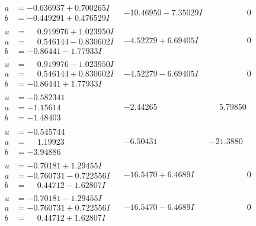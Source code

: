 \documentclass[1p]{elsarticle_modified}
\theoremstyle{definition}
\begin{document}
$$\begin{array}{c|c|c}
\begin{aligned}
a &= -0.636937 + 0.700265 I \\
b &= -0.449291 + 0.476529 I\end{aligned}
 & -10.46950 - 7.35029 I & \phantom{-0.000000 } 0 \\ \hline\begin{aligned}
u &= \phantom{-}0.919976 + 1.023950 I \\
a &= \phantom{-}0.546144 - 0.830602 I \\
b &= -0.86441 - 1.77933 I\end{aligned}
 & -4.52279 + 6.69405 I & \phantom{-0.000000 } 0 \\ \hline\begin{aligned}
u &= \phantom{-}0.919976 - 1.023950 I \\
a &= \phantom{-}0.546144 + 0.830602 I \\
b &= -0.86441 + 1.77933 I\end{aligned}
 & -4.52279 - 6.69405 I & \phantom{-0.000000 } 0 \\ \hline\begin{aligned}
u &= -0.582341\phantom{ +0.000000I} \\
a &= -1.15614\phantom{ +0.000000I} \\
b &= -1.48403\phantom{ +0.000000I}\end{aligned}
 & -2.44265\phantom{ +0.000000I} & \phantom{-}5.79850\phantom{ +0.000000I} \\ \hline\begin{aligned}
u &= -0.545744\phantom{ +0.000000I} \\
a &= \phantom{-}1.19923\phantom{ +0.000000I} \\
b &= -3.94886\phantom{ +0.000000I}\end{aligned}
 & -6.50431\phantom{ +0.000000I} & -21.3880\phantom{ +0.000000I} \\ \hline\begin{aligned}
u &= -0.70181 + 1.29455 I \\
a &= -0.760731 - 0.722556 I \\
b &= \phantom{-}0.44712 - 1.62807 I\end{aligned}
 & -16.5470 + 6.4689 I & \phantom{-0.000000 } 0 \\ \hline\begin{aligned}
u &= -0.70181 - 1.29455 I \\
a &= -0.760731 + 0.722556 I \\
b &= \phantom{-}0.44712 + 1.62807 I\end{aligned}
 & -16.5470 - 6.4689 I & \phantom{-0.000000 } 0 \\ \hline\begin{aligned}

\end{aligned}
\end{array}$$
\end{document}
